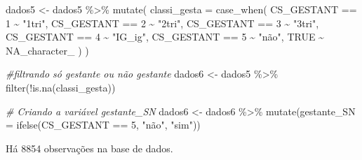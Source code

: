 \documentclass[
]{article}
\newenvironment{Shaded}{\begin{snugshade}}{\end{snugshade}}
\newcommand{\AttributeTok}[1]{\textcolor[rgb]{0.77,0.63,0.00}{#1}}
\newcommand{\CommentTok}[1]{\textcolor[rgb]{0.56,0.35,0.01}{\textit{#1}}}
\newcommand{\ConstantTok}[1]{\textcolor[rgb]{0.00,0.00,0.00}{#1}}
\newcommand{\DecValTok}[1]{\textcolor[rgb]{0.00,0.00,0.81}{#1}}
\newcommand{\FunctionTok}[1]{\textcolor[rgb]{0.00,0.00,0.00}{#1}}
\newcommand{\NormalTok}[1]{#1}
\newcommand{\OtherTok}[1]{\textcolor[rgb]{0.56,0.35,0.01}{#1}}
\newcommand{\SpecialCharTok}[1]{\textcolor[rgb]{0.00,0.00,0.00}{#1}}
\newcommand{\StringTok}[1]{\textcolor[rgb]{0.31,0.60,0.02}{#1}}
\begin{document}
\begin{Shaded}
\begin{Highlighting}[]
\NormalTok{dados5 }\OtherTok{\textless{}{-}}\NormalTok{ dados5 }\SpecialCharTok{\%\textgreater{}\%}
  \FunctionTok{mutate}\NormalTok{(}
    \AttributeTok{classi\_gesta =} \FunctionTok{case\_when}\NormalTok{(}
\NormalTok{      CS\_GESTANT }\SpecialCharTok{==} \DecValTok{1}  \SpecialCharTok{\textasciitilde{}} \StringTok{"1tri"}\NormalTok{,}
\NormalTok{      CS\_GESTANT }\SpecialCharTok{==} \DecValTok{2}  \SpecialCharTok{\textasciitilde{}} \StringTok{"2tri"}\NormalTok{,}
\NormalTok{      CS\_GESTANT }\SpecialCharTok{==} \DecValTok{3}  \SpecialCharTok{\textasciitilde{}} \StringTok{"3tri"}\NormalTok{,}
\NormalTok{      CS\_GESTANT }\SpecialCharTok{==} \DecValTok{4}  \SpecialCharTok{\textasciitilde{}} \StringTok{"IG\_ig"}\NormalTok{,}
\NormalTok{      CS\_GESTANT }\SpecialCharTok{==} \DecValTok{5}  \SpecialCharTok{\textasciitilde{}} \StringTok{"não"}\NormalTok{,}
      \ConstantTok{TRUE} \SpecialCharTok{\textasciitilde{}} \ConstantTok{NA\_character\_}
\NormalTok{    )}
\NormalTok{  )}

\CommentTok{\#filtrando só gestante ou não gestante}
\NormalTok{dados6 }\OtherTok{\textless{}{-}}\NormalTok{ dados5 }\SpecialCharTok{\%\textgreater{}\%} 
  \FunctionTok{filter}\NormalTok{(}\SpecialCharTok{!}\FunctionTok{is.na}\NormalTok{(classi\_gesta))}


\CommentTok{\# Criando a variável gestante\_SN}
\NormalTok{dados6 }\OtherTok{\textless{}{-}}\NormalTok{ dados6 }\SpecialCharTok{\%\textgreater{}\%}
  \FunctionTok{mutate}\NormalTok{(}\AttributeTok{gestante\_SN =} \FunctionTok{ifelse}\NormalTok{(CS\_GESTANT }\SpecialCharTok{==} \DecValTok{5}\NormalTok{, }\StringTok{"não"}\NormalTok{, }\StringTok{"sim"}\NormalTok{))}
\end{Highlighting}
\end{Shaded}

Há 8854 observações na base de dados.
\end{document}
